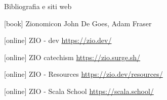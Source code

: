 \begin{frame}{Bibliografia e siti web}

  \begin{thebibliography}{9}
      [book]
      \bibitem{} Zionomicon
      \newblock John De Goes, Adam Fraser 
      
      [online]
      \bibitem{} ZIO - dev
      \newblock \url{https://zio.dev/}
      
      [online]
      \bibitem{} ZIO catechism
      \newblock \url{https://zio.surge.sh/}
      
      [online]
      \bibitem{} ZIO - Resources
      \newblock \url{https://zio.dev/resources/}

      [online]
      \bibitem{} ZIO - Scala School
      \newblock \url{https://scala.school/}
  \end{thebibliography}
  
\end{frame}